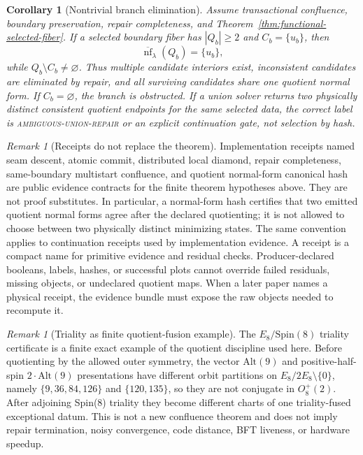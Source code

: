 \documentclass[11pt]{article}
\newtheorem{corollary}[theorem]{Corollary}
\theoremstyle{remark}
\newtheorem{remark}[theorem]{Remark}
\theoremstyle{plain}
\begin{document}
\begin{corollary}[Nontrivial branch elimination]\label{cor:branch-elimination}
Assume transactional confluence, boundary preservation, repair completeness, and
Theorem~\ref{thm:functional-selected-fiber}. If a selected boundary fiber has \(|Q_b|\ge2\) and
\(C_b=\{u_b\}\), then
\[
\overline{\operatorname{nf}}_\lambda(Q_b)=\{u_b\},
\]
while \(Q_b\setminus C_b\ne\varnothing\). Thus multiple candidate interiors exist, inconsistent
candidates are eliminated by repair, and all surviving candidates share one quotient normal form.
If \(C_b=\varnothing\), the branch is obstructed. If a union solver returns two physically
distinct consistent quotient endpoints for the same selected data, the correct label is
\textsc{ambiguous-union-repair} or an explicit continuation gate, not selection by hash.
\end{corollary}

\begin{remark}[Receipts do not replace the theorem]\label{rem:receipt-boundary}
Implementation receipts named seam descent, atomic commit, distributed local diamond, repair
completeness, same-boundary multistart confluence, and quotient normal-form canonical hash are
public evidence contracts for the finite theorem hypotheses above. They are not proof substitutes.
In particular, a normal-form hash certifies that two emitted quotient normal forms agree after the
declared quotienting; it is not allowed to choose between two physically distinct minimizing
states.
The same convention applies to continuation receipts used by implementation evidence. A receipt is a compact
name for primitive evidence and residual checks. Producer-declared booleans, labels, hashes, or
successful plots cannot override failed residuals, missing objects, or undeclared quotient maps.
When a later paper names a physical receipt, the evidence bundle must expose the raw objects needed
to recompute it.
\end{remark}

\begin{remark}[Triality as finite quotient-fusion example]\label{rem:triality-quotient-fusion}
The \(E_8/\mathrm{Spin}(8)\) triality certificate is a finite exact example of the quotient
discipline used here. Before quotienting by the allowed outer symmetry, the vector
\(\mathrm{Alt}(9)\) and positive-half-spin \(2\!\cdot\!\mathrm{Alt}(9)\) presentations have
different orbit partitions on \(E_8/2E_8\setminus\{0\}\), namely \(\{9,36,84,126\}\) and
\(\{120,135\}\), so they are not conjugate in \(O_8^+(2)\). After adjoining Spin(8) triality they
become different charts of one triality-fused exceptional datum. This is not a new confluence
theorem and does not imply repair termination, noisy convergence, code distance, BFT liveness, or
hardware speedup.
\end{remark}
\end{document}
